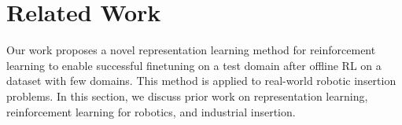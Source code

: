 \documentclass{article}
\begin{document}

\section{Related Work}


Our work proposes a novel representation learning method for reinforcement learning to enable successful finetuning on a test domain after offline RL on a dataset with few domains. This method is applied to real-world robotic insertion problems. In this section, we discuss prior work on representation learning, reinforcement learning for robotics, and industrial insertion.
\end{document}
